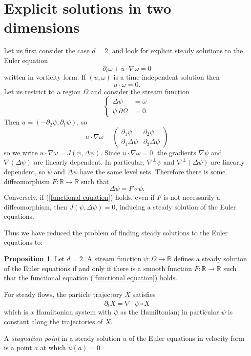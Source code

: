 \documentclass[12pt]{book}
\newcommand{\RR}{\mathbb{R}}
\newcommand{\dfn}[1]{\emph{#1}\index{#1}}
\theoremstyle{definition}
\newtheorem{proposition}[theorem]{Proposition}
\newenvironment{definition}
  {\pushQED{\qed}\renewcommand{\qedsymbol}{$\diamondsuit$}\definitionx}
  {\popQED\endexamplex}
\begin{document}
\section{Explicit solutions in two dimensions}
Let us first consider the case $d = 2$, and look for explicit steady solutions to the Euler equation
$$\partial_t \omega + u \cdot \nabla \omega = 0$$
written in vorticity form.
If $(u, \omega)$ is a time-independent solution then
$$u \cdot \omega = 0.$$
Let us restrict to a region $\Omega$ and consider the stream function
$$\begin{cases}
\Delta \psi &= \omega\\
\psi|\partial \Omega &= 0.
\end{cases}$$
Then $u = (-\partial_2 \psi, \partial_1\psi)$, so
$$u \cdot \nabla \omega = \begin{pmatrix}\partial_1 \psi & \partial_2 \psi \\
\partial_1 \Delta \psi & \partial_2 \Delta \psi
\end{pmatrix}$$
so we write $u \cdot \nabla \omega = J(\psi, \Delta \psi)$.
Since $u \cdot \nabla \omega = 0$, the gradients $\nabla \psi$ and $\nabla(\Delta \psi)$ are linearly dependent.
In particular, $\nabla^\perp \psi$ and $\nabla^\perp(\Delta \psi)$ are linearly dependent, so $\psi$ and $\Delta \psi$ have the same level sets.
Therefore there is some diffeomorphism $F: \RR \to \RR$ such that
\begin{equation}
\label{functional equation}
\Delta \psi = F \circ \psi.
\end{equation}
Conversely, if (\ref{functional equation}) holds, even if $F$ is not necessarily a diffeomorphism, then $J(\psi, \Delta \psi) = 0$, inducing a steady solution of the Euler equations.

Thus we have reduced the problem of finding steady solutions to the Euler equations to:
\begin{proposition}
Let $d = 2$.
A stream function $\psi: \Omega \to \RR$ defines a steady solution of the Euler equations if and only if there is a smooth function $F: \RR \to \RR$ such that the functional equation (\ref{functional equation}) holds.
\end{proposition}

For steady flows, the particle trajectory $X$ satisfies
$$\partial_t X = \nabla^\perp \psi \circ X$$
which is a Hamiltonian system with $\psi$ as the Hamiltonian; in particular $\psi$ is constant along the trajectories of $X$.

\begin{definition}
A \dfn{stagnation point} in a steady solution $u$ of the Euler equations in velocity form is a point $a$ at which $u(a) = 0$.
\end{definition}
\end{document}
